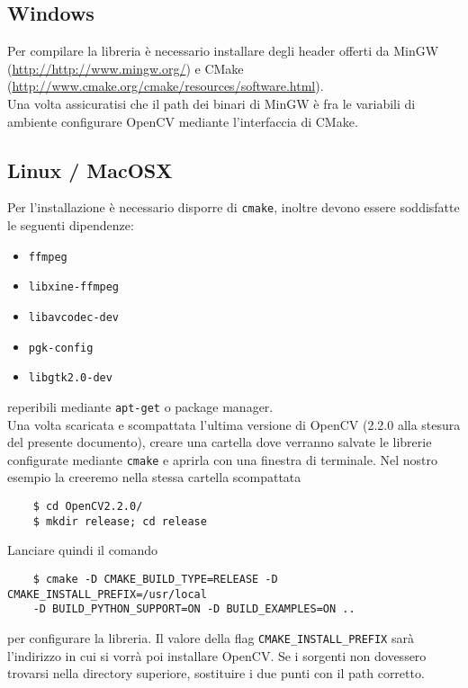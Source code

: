 \documentclass[12pt]{report}
\begin{document}
\subsection{Windows}
Per compilare la libreria \`e necessario installare degli header offerti da MinGW (\url{http://http://www.mingw.org/}) e CMake (\url{http://www.cmake.org/cmake/resources/software.html}).\\
\noindent Una volta assicuratisi che il path dei binari di MinGW \`e fra le variabili di ambiente configurare OpenCV mediante l'interfaccia di CMake.

\subsection{Linux / MacOSX}

\noindent Per l'installazione \`e necessario disporre di \verb|cmake|, inoltre devono essere soddisfatte le seguenti dipendenze:
\begin{itemize}
\item \verb|ffmpeg|
\item \verb|libxine-ffmpeg|
\item \verb|libavcodec-dev|
\item \verb|pgk-config|
\item \verb|libgtk2.0-dev|
\end{itemize}

\noindent reperibili mediante \verb|apt-get| o package manager.\\

\noindent Una volta scaricata e scompattata l'ultima versione di OpenCV (2.2.0 alla stesura del presente documento), creare una cartella dove verranno salvate le librerie configurate mediante \verb|cmake| e aprirla con una finestra di terminale. Nel nostro esempio la creeremo nella stessa cartella scompattata

\begin{verbatim}
	$ cd OpenCV2.2.0/
	$ mkdir release; cd release
\end{verbatim}

\noindent Lanciare quindi il comando

\begin{verbatim}
	$ cmake -D CMAKE_BUILD_TYPE=RELEASE -D CMAKE_INSTALL_PREFIX=/usr/local
	-D BUILD_PYTHON_SUPPORT=ON -D BUILD_EXAMPLES=ON ..
\end{verbatim}

\noindent per configurare la libreria. Il valore della flag \verb|CMAKE_INSTALL_PREFIX| sar\`a l'indirizzo in cui si vorr\`a poi installare OpenCV. Se i sorgenti non dovessero trovarsi nella directory superiore, sostituire i due punti con il path corretto.\\
\end{document}
